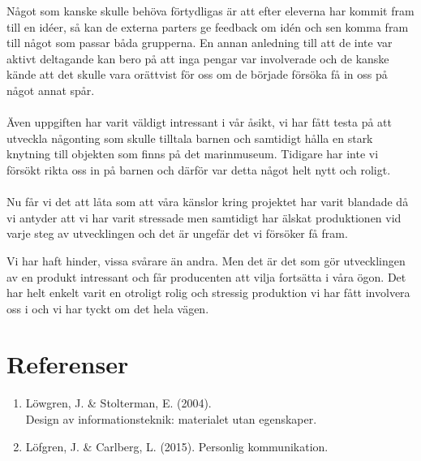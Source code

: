 \documentclass[12pt, titlepage]{article}
\begin{document}
Något som kanske skulle behöva förtydligas är att efter eleverna har kommit fram till en idéer, 
så kan de externa parters ge feedback om idén och sen komma fram till något som passar båda grupperna. 
En annan anledning till att de inte var aktivt deltagande kan bero på att inga pengar var involverade och 
de kanske kände att det skulle vara orättvist för oss om de började försöka få in oss på något annat spår.
\\
\\
Även uppgiften har varit väldigt intressant i vår åsikt, vi har fått testa på att utveckla någonting som skulle 
tilltala barnen och samtidigt hålla en stark knytning till objekten som finns på det marinmuseum. 
Tidigare har inte vi försökt rikta oss in på barnen och därför var detta något helt nytt och roligt.
\\
\\
Nu får vi det att låta som att våra känslor kring projektet har varit blandade då vi antyder att vi 
har varit stressade men samtidigt har älskat produktionen vid varje steg av utvecklingen och det är ungefär det vi försöker få fram. 

Vi har haft hinder, vissa svårare än andra. Men det är det som gör utvecklingen av en produkt intressant och får 
producenten att vilja fortsätta i våra ögon. Det har helt enkelt varit en otroligt rolig och 
stressig produktion vi har fått involvera oss i och vi har tyckt om det hela vägen.
\newpage
\section{Referenser}
\begin{enumerate}
  \item Löwgren, J. & Stolterman, E. (2004). 
    \\
    Design av informationsteknik: materialet utan egenskaper.
  \item Löfgren, J. & Carlberg, L. (2015). 
    Personlig kommunikation. 
\end{enumerate}
\end{document}
